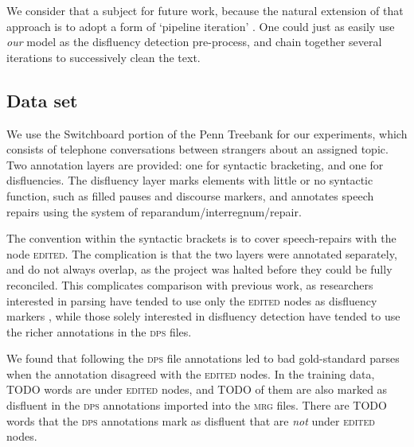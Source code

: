 \documentclass[11pt,letterpaper]{article}
\begin{document}
We consider that a subject for future work, because the natural extension of
that approach is to adopt a form of `pipeline iteration'
\citet{hollingshead:07}. One could just as easily use \emph{our} model as the
disfluency detection pre-process, and chain together several iterations to
successively clean the text.

\subsection{Data set}

We use the Switchboard portion of the Penn Treebank \citep{marcus:93} for our
experiments, which consists of telephone conversations between strangers about
an assigned topic.  Two annotation layers are provided: one for syntactic bracketing,
and one for disfluencies.  The disfluency layer marks elements with
little or no syntactic function, such as filled pauses and discourse markers,
and annotates speech repairs using the \citet{shriberg:94} system of
reparandum/interregnum/repair.

The convention within the syntactic brackets is to cover speech-repairs with
the node \textsc{edited}.  The complication is that the two layers were annotated
separately, and do not always overlap, as the project was halted before they
could be fully reconciled. This complicates comparison with previous work, as
researchers interested in parsing have tended to use only the \textsc{edited}
nodes as disfluency markers \citep{Charniak01a,jorgensen:07}, while those solely
interested in disfluency detection have tended to use the richer annotations in
the \textsc{dps} files.

We found that following the \textsc{dps} file annotations led to bad
gold-standard parses when the annotation disagreed with the \textsc{edited}
nodes.  In the training data, TODO words are under \textsc{edited} nodes, and
TODO of them are also marked as disfluent in the \textsc{dps} annotations
imported into the \textsc{mrg} files. There are TODO words that the \textsc{dps}
annotations mark as disfluent that are \emph{not} under \textsc{edited} nodes.
\end{document}
